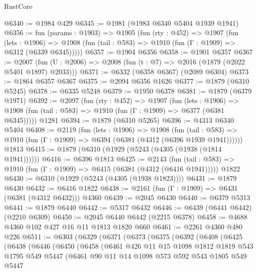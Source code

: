 \begin{lexlean}{RustCore}
\begin{coremodule}
@6340 := @1984 @429
@6345 := @1981 (@1983 @6340 @5404 @1939 @1941)
@6356 := fun (params : @1903) =>
  @1905
    (fun (rty : @452) =>
    @1907
      (fun (lets : @1906) =>
      @1908 (fun (tail : @583) => @1910 (fun (Γ : @1909) => @6312 (@6339 @6345)))))
@6357 := @1904 @6356
@6358 := @1901 @6357
@6367 := @2007 (fun (U : @2006) => @2008 (fun (t : @7) => @2016 (@1879 (@2022 @5401 @1897) @2033)))
@6371 := @6332 (@6358 @6367) (@2089 @6304)
@6373 := @1864 @6357 @6367
@6375 := @2094 @6356 @1626
@6377 := @1879 (@6310 @5245)
@6378 := @6335 @5248
@6379 := @1950 @6378
@6381 := @1879 (@6379 @1971)
@6392 := @2097
    (fun (rty : @452) =>
    @1907
      (fun (lets : @1906) =>
      @1908 (fun (tail : @583) => @1910 (fun (Γ : @1909) => @6377 (@6381 @6345)))))
    @1281
@6394 := @1879 (@6310 @5265)
@6396 := @4313 @6340 @5404
@6408 := @2119
    (fun (lets : @1906) =>
    @1908
      (fun (tail : @583) => @1910 (fun (Γ : @1909) => @6394 (@6381 (@4312 (@6396 @1939 @1941))))))
    @1813
@6415 := @1879 (@6310 (@1929 (@5243 (@4305 (@1938 (@1814 @1941))))))
@6416 := @6396 @1813
@6425 := @2143
    (fun (tail : @583) => @1910 (fun (Γ : @1909) => @6415 (@6381 (@4312 (@6416 @1941)))))
    @1822
@6430 := @6310 (@1929 (@5243 (@4305 (@1938 @1823))))
@6431 := @1879 @6430
@6432 := @6416 @1822
@6438 := @2161 (fun (Γ : @1909) => @6431 (@6381 (@4312 @6432))) @4360
@6439 := @2045 @6430
@6440 := @6379 @5313
@6441 := @1879 @6440
@6442 := @5317 @6432
@6446 := @6439 (@6441 @6442) (@2210 @6309)
@6450 := @2045 @6440 @6442 (@2215 @6378)
@6458 := @4688 @4360 @102 @427 @16 @11 @1813 @1820 @660
@6461 := @2261 @4360 @480 @226
@6511 := @6303
    (@6329
      (@6371
        (@6373
          (@6375
            (@6392
              (@6408
                (@6425
                  (@6438
                    (@6446
                      (@6450
                        (@6458
                          (@6461
                            @426
                            @11
                            @15
                            @1098
                            @1812
                            @1819
                            @543
                            @1795
                            @549
                            @5447
                            (@6461
                              @90
                              @11
                              @14
                              @1098
                              @573
                              @592
                              @543
                              @1805
                              @549
                              @5447

\end{coremodule}
\end{lexlean}
